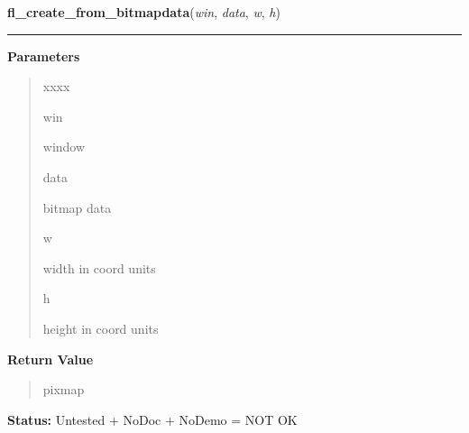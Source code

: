 \hspace{.8\funcindent}\begin{boxedminipage}{\funcwidth}

    \raggedright \textbf{fl\_create\_from\_bitmapdata}(\textit{win}, \textit{data}, \textit{w}, \textit{h})

    \vspace{-1.5ex}

    \rule{\textwidth}{0.5\fboxrule}
\setlength{\parskip}{2ex}
\setlength{\parskip}{1ex}
      \textbf{Parameters}
      \vspace{-1ex}

      \begin{quote}
        \begin{Ventry}{xxxx}

          \item[win]

          window

          \item[data]

          bitmap data

          \item[w]

          width in coord units

          \item[h]

          height in coord units

        \end{Ventry}

      \end{quote}

      \textbf{Return Value}
    \vspace{-1ex}

      \begin{quote}
      pixmap

      \end{quote}

\textbf{Status:} Untested + NoDoc + NoDemo = NOT OK



    \end{boxedminipage}

    \label{xformslib:flbitmap:fl_add_pixmap}

    \vspace{0.5ex}

